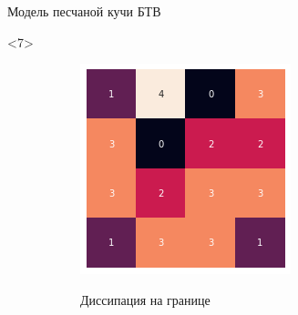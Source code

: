 \documentclass{beamer}
\begin{document}
\begin{frame}{Модель песчаной кучи БТВ}
		\begin{onlyenv}<7>
			\begin{figure}[ht]
				\centering
				\begin{subfigure}{0.45\textwidth}
					\includegraphics[width=\linewidth]{slides/btw_6}
				\end{subfigure}
				\begin{subfigure}{0.45\textwidth}
					Диссипация на границе
				\end{subfigure}
			\end{figure}
		\end{onlyenv}
	

\end{frame}
\end{document}
